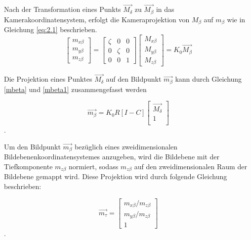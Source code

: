 Nach der Transformation eines Punkts $\vec{M_\delta}$ zu $\vec{M_\beta}$ in das Kamerakoordinatensystem, erfolgt die Kameraprojektion von $M_\beta$ auf $m_\beta$ wie in Gleichung \ref{eq:2.1} beschrieben. %
\begin{equation}
\begin{bmatrix}
m_{x \beta}\\m_{y \beta}\\m_{z \beta}
\end{bmatrix} = \begin{bmatrix}
\zeta&0&0\\
0&\zeta&0\\
0&0&1
\end{bmatrix}
\begin{bmatrix}
M_{x \beta}\\M_{y \beta}\\M_{z \beta}
\end{bmatrix}
=K_0\vec{M_{\beta}}\label{mbeta1}
\end{equation}
\pagebreak

Die Projektion eines Punktes $\vec{M_\delta}$ auf den Bildpunkt $\vec{m_{\beta}}$ kann durch Gleichung \ref{mbeta} und \ref{mbeta1} zusammengefasst werden

\begin{equation}
\vec{m_\beta}
=K_0 R	[I -C] \begin{bmatrix}
\vec{M_\delta}\\
1\\
\end{bmatrix} 
\end{equation}. 


Um den Bildpunkt $\vec{m_{\beta}}$ bezüglich eines zweidimensionalen Bildebenenkoordinatensystemes anzugeben, wird die Bildebene mit der Tiefkomponente $m_{z\beta}$ normiert, sodass $m_{z\beta}$ auf den zweidimensionalen Raum der Bildebene gemappt wird. Diese Projektion wird durch folgende Gleichung beschrieben:

\begin{equation}
\vec{m_\tau} =
\begin{bmatrix}
m_{x \beta}/m_{z \beta}\\m_{y \beta}/m_{z \beta}\\1
\end{bmatrix}
 \end{equation}.

